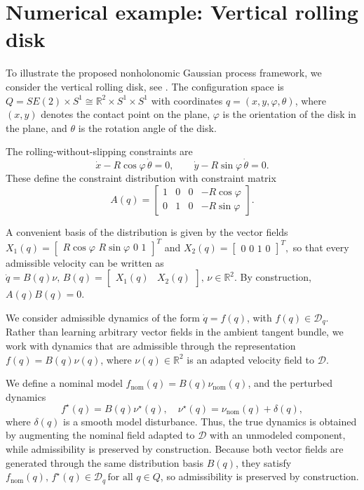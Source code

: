 \documentclass[letterpaper, 10 pt, conference]{ieeeconf}
\newcommand{\D}{\mathcal{D}}
\begin{document}
\section{Numerical example: Vertical rolling disk}
\label{sec:simulations}

To illustrate the proposed nonholonomic Gaussian process framework, we consider the vertical rolling disk, see \cite{bloch2003nonholonomic}. The configuration space is $Q = SE(2)\times S^1 \cong \mathbb{R}^2\times S^1\times S^1$ with coordinates $q=(x,y,\varphi,\theta)$, where $(x,y)$ denotes the contact point on the plane, $\varphi$ is the orientation of the disk in the plane, and $\theta$ is the rotation angle of the disk. 

The rolling-without-slipping constraints are
\begin{equation}
\dot x - R\cos\varphi\,\dot\theta = 0,
\qquad
\dot y - R\sin\varphi\,\dot\theta = 0.
\label{eq:vrd_constraints}
\end{equation}
These define the constraint distribution with constraint matrix
\begin{equation}
A(q)=
\begin{bmatrix}
1 & 0 & 0 & -R\cos\varphi\\
0 & 1 & 0 & -R\sin\varphi
\end{bmatrix}.
\label{eq:vrd_A}
\end{equation}

A convenient basis of the distribution is given by the vector fields $\displaystyle{X_1(q)=
\begin{bmatrix}
R\cos\varphi\,\, 
R\sin\varphi\,\,
0\,\,
1
\end{bmatrix}^{T}}$ and $X_2(q)=
\begin{bmatrix}
0\,\,
0\,\,
1\,\,
0
\end{bmatrix}^{T},$ so that every admissible velocity can be written as
$\dot q = B(q)\nu,
\,
B(q)=\begin{bmatrix} X_1(q) & X_2(q)\end{bmatrix},
\,
\nu\in\mathbb{R}^2$. By construction, $A(q)B(q)=0$.

We consider admissible dynamics of the form $\dot q = f(q)$, with $f(q)\in \D_q$. Rather than learning arbitrary vector fields in the ambient tangent bundle, we work with dynamics that are admissible through the representation $f(q)=B(q)\nu(q)$, where $\nu(q)\in\mathbb{R}^2$ is an adapted velocity field to $\D$.

We define a nominal model
$f_{\mathrm{nom}}(q)=B(q)\nu_{\mathrm{nom}}(q)$, and the perturbed dynamics
\[
f^\star(q)=B(q)\nu^\star(q),\quad
\nu^\star(q)=\nu_{\mathrm{nom}}(q)+\delta(q),
\]
where $\delta(q)$ is a smooth model disturbance. Thus, the true dynamics is obtained by augmenting the nominal field adapted to $\D$ with an unmodeled component, while admissibility is preserved by construction. Because both vector fields are generated through the same distribution basis $B(q)$, they satisfy $f_{\mathrm{nom}}(q),\, f^\star(q)\in \D_q
\, \text{for all } q\in Q$, so admissibility is preserved by construction.
\end{document}
